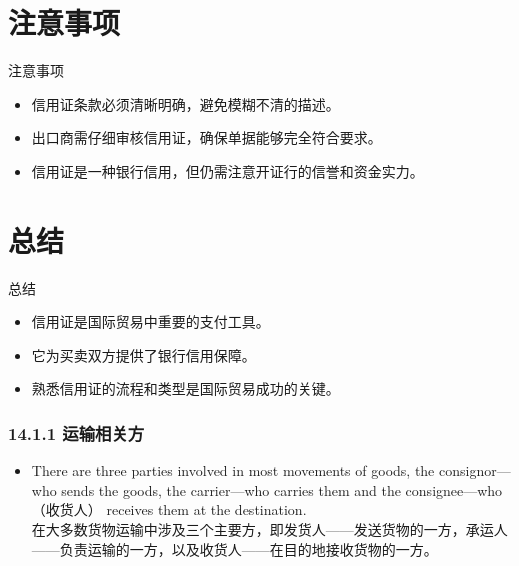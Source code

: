 \documentclass[12pt]{beamer}
\begin{document}
\section{注意事项}
\begin{frame}{注意事项}
    \begin{itemize}
        \item 信用证条款必须清晰明确，避免模糊不清的描述。
        \item 出口商需仔细审核信用证，确保单据能够完全符合要求。
        \item 信用证是一种银行信用，但仍需注意开证行的信誉和资金实力。
    \end{itemize}
\end{frame}

\section{总结}
\begin{frame}{总结}
    \begin{itemize}
        \item 信用证是国际贸易中重要的支付工具。
        \item 它为买卖双方提供了银行信用保障。
        \item 熟悉信用证的流程和类型是国际贸易成功的关键。
    \end{itemize}
\end{frame}





\begin{frame}[allowframebreaks]
    \frametitle{14.1.1 运输相关方}
    \begin{itemize}
    \item There are three parties involved in most movements of goods, the consignor—who sends the goods, the carrier—who carries them and the consignee—who（收货人） receives them at the destination. \\
    在大多数货物运输中涉及三个主要方，即发货人——发送货物的一方，承运人——负责运输的一方，以及收货人——在目的地接收货物的一方。
    \end{itemize}
    \end{frame}
    
\end{document}
